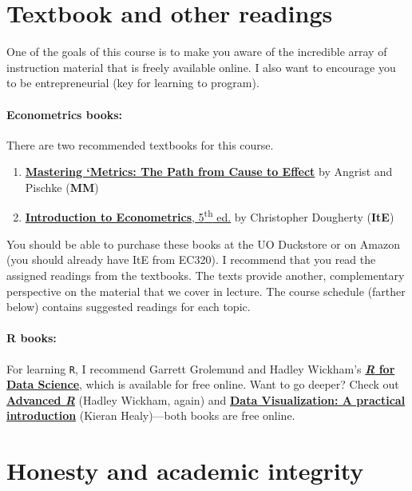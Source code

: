 \documentclass[10pt]{article}
\begin{document}
\section*{Textbook and other readings}

One of the goals of this course is to make you aware of the incredible array of instruction material that is freely available online. I also want to encourage you to be entrepreneurial (key for learning to program).

\paragraph{Econometrics books:} There are two recommended textbooks for this course.

\begin{enumerate}
  \item \href{https://www.amazon.com/Mastering-Metrics-Path-Cause-Effect/dp/0691152845/}{\textbf{Mastering `Metrics: The Path from Cause to Effect}} by Angrist and Pischke (\textbf{MM})
  \item \href{http://smile.amazon.com/Introduction-Econometrics-Christopher-Dougherty/dp/0199676828/}{\textbf{Introduction to Econometrics}, 5\textsuperscript{th} ed.} by Christopher Dougherty (\textbf{ItE})
\end{enumerate}
You should be able to purchase these books at the UO Duckstore or on Amazon (you should already have ItE from EC320). I recommend that you read the assigned readings from the textbooks. The texts provide another, complementary perspective on the material that we cover in lecture. The course schedule (farther below) contains suggested readings for each topic.

\paragraph{R books:} For learning \texttt{R}, I recommend Garrett Grolemund and Hadley Wickham's \href{http://r4ds.had.co.nz}{\textbf{\textit{R} for Data Science}}, which is available for free online. Want to go deeper? Check out \href{http://adv-r.had.co.nz/}{\textbf{Advanced \textit{R}}} (Hadley Wickham, again) and \href{http://socviz.co/}{\textbf{Data Visualization: A practical introduction}} (Kieran Healy)---both books are free online.

\section*{Honesty and academic integrity}
\end{document}
